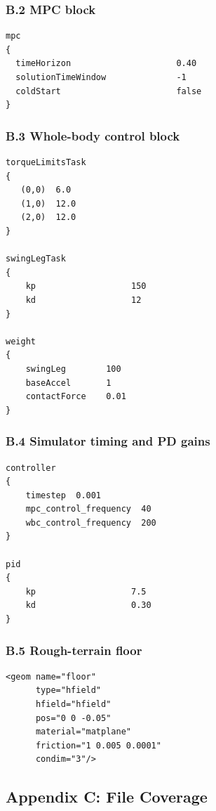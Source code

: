 \documentclass[11pt,a4paper]{article}
\begin{document}
\subsubsection*{B.2 MPC block}
\begin{lstlisting}[style=cfgstyle]
mpc
{
  timeHorizon                     0.40
  solutionTimeWindow              -1
  coldStart                       false
}
\end{lstlisting}

\subsubsection*{B.3 Whole-body control block}
\begin{lstlisting}[style=cfgstyle]
torqueLimitsTask
{
   (0,0)  6.0
   (1,0)  12.0
   (2,0)  12.0
}

swingLegTask
{
    kp                   150
    kd                   12
}

weight
{
    swingLeg        100
    baseAccel       1
    contactForce    0.01
}
\end{lstlisting}

\subsubsection*{B.4 Simulator timing and PD gains}
\begin{lstlisting}[style=cfgstyle]
controller
{
    timestep  0.001
    mpc_control_frequency  40
    wbc_control_frequency  200
}

pid
{
    kp                   7.5
    kd                   0.30
}
\end{lstlisting}

\subsubsection*{B.5 Rough-terrain floor}
\begin{lstlisting}[style=cfgstyle]
<geom name="floor"
      type="hfield"
      hfield="hfield"
      pos="0 0 -0.05"
      material="matplane"
      friction="1 0.005 0.0001"
      condim="3"/>
\end{lstlisting}

\subsection{Appendix C: File Coverage}
\end{document}
